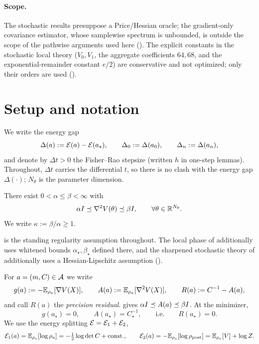 \paragraph{Scope.}
The stochastic results presuppose a Price/Hessian oracle; the gradient-only covariance estimator,
whose samplewise spectrum is unbounded, is outside the scope of the pathwise arguments used here
(). The explicit constants in the stochastic local theory ($V_0,V_1$, the aggregate
coefficients $64,68$, and the exponential-remainder constant $e/2$) are conservative and not
optimized; only their orders are used ().

\section{Setup and notation}
\label{sec:setup}

We write the energy gap
\[
    \Delta(a):=\mathcal{E}(a)-\mathcal{E}(a_\star),
    \qquad
    \Delta_0:=\Delta(a_0),
    \qquad
    \Delta_n:=\Delta(a_n),
\]
and denote by $\Delta t>0$ the Fisher--Rao stepsize (written $h$ in one-step lemmas). Throughout,
$\Delta t$ carries the differential $t$, so there is no clash with the energy gap $\Delta(\cdot)$;
$N_\theta$ is the parameter dimension.

\begin{assumption}
\label{assump:logconcave-smooth}
There exist $0<\alpha\leq\beta<\infty$ with
\[
    \alpha I\preceq\nabla^2V(\theta)\preceq\beta I,
    \qquad
    \forall\theta\in\mathbb{R}^{N_\theta}.
\]
We write $\kappa:=\beta/\alpha\geq1$.
\end{assumption}

 is the standing regularity assumption throughout. The local phase
of  additionally uses whitened bounds $\alpha_\star,\beta_\star$ defined there, and
the sharpened stochastic theory of  additionally uses a Hessian-Lipschitz
assumption ().

For $a=(m,C)\in\mathcal{A}$ we write
\begin{equation}
\label{eq:gAR}
    g(a):=-\mathbb{E}_{\rho_a}[\nabla V(X)],
    \qquad
    A(a):=\mathbb{E}_{\rho_a}[\nabla^2V(X)],
    \qquad
    R(a):=C^{-1}-A(a),
\end{equation}
and call $R(a)$ the \emph{precision residual}.  gives
$\alpha I\preceq A(a)\preceq\beta I$. At the minimizer,
\begin{equation}
\label{eq:first-order}
    g(a_\star)=0,
    \qquad
    A(a_\star)=C_\star^{-1},
    \qquad\text{i.e.}\qquad
    R(a_\star)=0 .
\end{equation}
We use the energy splitting $\mathcal{E}=\mathcal{E}_1+\mathcal{E}_2$,
\begin{equation}
\label{eq:splitting}
    \mathcal{E}_1(a)=\mathbb{E}_{\rho_a}[\log\rho_a]=-\tfrac12\log\det C+\text{const.},
    \qquad
    \mathcal{E}_2(a)=-\mathbb{E}_{\rho_a}[\log\rho_{\mathrm{post}}]=\mathbb{E}_{\rho_a}[V]+\log Z .
\end{equation}

